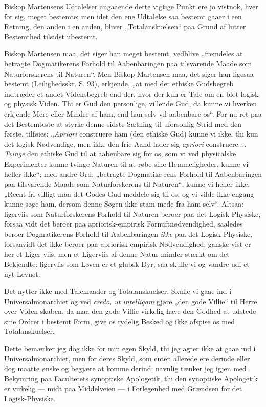 \documentclass[12pt]{book}
\newcommand{\opage}[1]{\marginnote{\footnotesize\textit{[#1]}}}
\begin{document}
Biskop Martensens Udtalelser angaaende dette vigtige
Punkt ere jo vistnok, hver for sig, meget bestemte; men idet
den ene Udtalelse saa bestemt gaaer i een Retning, den anden
i en anden, bliver „Totalanskuelsen“ paa Grund af lutter
Bestemthed tilsidst ubestemt.

Biskop Martensen maa, det siger han meget bestemt,
\opage{68}\setcounter{footnote}{0}%
vedblive „fremdeles at betragte Dogmatikerens Forhold til
Aabenbaringen paa tilsvarende Maade som Naturforskerens
til Naturen“. Men Biskop Martensen maa, det siger han
ligesaa bestemt (Leilighedsskr. S. 93), erkjende, „at med det
ethiske Gudsbegreb indtræder et andet Vidensbegreb end der,
hvor der kun er Tale om en blot logisk og physisk Viden.
Thi er Gud den personlige, villende Gud, da kunne vi
hverken erkjende Mere eller Mindre af ham, end han selv
vil aabenbare os“. For nu ret paa det Bestemteste at styrke
denne sidste Sætning til uforsonlig Strid med den første,
tilføies: „\textit{Apriori} construere ham (den ethiske Gud) kunne vi
ikke, thi kun det logisk Nødvendige, men ikke den frie Aand
lader sig \textit{apriori} construere.... \emph{Tvinge} den ethiske Gud til
at aabenbare sig for os, som vi ved physicalske Experimenter
kunne tvinge Naturen til at røbe sine Hemmeligheder, kunne
vi heller ikke“; med andre Ord: „betragte Dogmatike\-%
rens Forhold til Aabenbaringen paa tilsvarende Maade som
Naturforskerens til Naturen“, kunne vi heller ikke. „Reent fri\-%
villigt maa det Godes Gud meddele sig til os, og vi vilde
ikke engang kunne søge ham, dersom denne Søgen ikke stam\-%
mede fra ham selv“. Altsaa: ligerviis som Naturforskerens
Forhold til Naturen beroer paa det Logisk-Physiske, forsaa\-%
vidt det beroer paa apriorisk-empirisk Fornuftnødvendighed,
saaledes beroer Dogmatikerens Forhold til Aabenbaringen
\emph{ikke} paa det Logisk-Physiske, forsaavidt det ikke beroer paa
apriorisk-empirisk Nødvendighed; ganske vist er her et Liger\-%
viis, men et Ligerviis af denne Natur minder stærkt om det
Bekjendte: ligerviis som Løven er et glubsk Dyr, saa skulle vi
og vandre udi et nyt Levnet.

Det nytter ikke med Talemaader og Totalanskuelser.
Skulle vi gaae ind i Universalmonarchiet og ved \textit{credo, ut
intelligam} gjøre „den gode Villie“ til Herre over Viden\-%
skaben, da maa den gode Villie virkelig have den Godhed at
udstede sine Ordrer i bestemt Form, give os tydelig Besked
og ikke afspise os med Totalanskuelser.

\opage{69}\setcounter{footnote}{0}%
Dette bemærker jeg dog ikke for min egen Skyld, thi
jeg agter ikke at gaae ind i Universalmonarchiet, men for
deres Skyld, som enten allerede ere derinde eller dog maatte
ønske og begjære at komme derind; navnlig tænker jeg igjen
med Bekymring paa Facultetets synoptiske Apologetik, thi den
synoptiske Apologetik er virkelig --- midt paa Middelveien ---
i Forlegenhed med Grændsen for det Logisk-Physiske.
\end{document}
